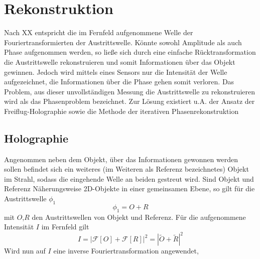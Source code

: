 \chapter{Rekonstruktion}
Nach XX entspricht die im Fernfeld aufgenommene Welle der Fouriertransformierten der Austrittswelle. Könnte sowohl Amplitude als auch Phase aufgenommen werden, so ließe sich durch eine einfache Rücktransformation die Austrittswelle rekonstruieren und somit Informationen über das Objekt gewinnen. Jedoch wird mittels eines Sensors nur die Intensität der Welle aufgezeichnet, die Informationen über die Phase gehen somit verloren. Das Problem, aus dieser unvollständigen Messung die Austrittswelle zu rekonstruieren wird als das Phasenproblem bezeichnet. Zur Lösung existiert u.A. der Ansatz der Freiflug-Holographie sowie die Methode der iterativen Phasenrekonstruktion
\section{Holographie}
Angenommen neben dem Objekt, über das Informationen gewonnen werden sollen befindet sich ein weiteres (im Weiteren als Referenz bezeichnetes) Objekt im Strahl, sodass die eingehende Welle an beiden gestreut wird. Sind Objekt und Referenz Näherungsweise 2D-Objekte in einer gemeinsamen Ebene, so gilt für die Austrittswelle $\phi_1$
\begin{equation}
	\phi_1=O+R
\end{equation}
mit $O$,$R$ den Austrittswellen von Objekt und Referenz. Für die aufgenommene Intensität $I$ im Fernfeld gilt
\begin{equation}
	I=\left|\mathscr{F}\left[O\right]+\mathscr{F}\left[R\right]\right|^2=\left|\tilde{O}+\tilde{R}\right|^2
\end{equation}
Wird nun auf $I$ eine inverse Fouriertransformation angewendet,

